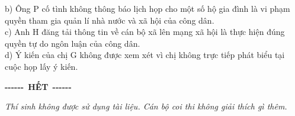 \documentclass[12pt,a4paper]{article}
\begin{document}
\noindent b) Ông P cố tình không thông báo lịch họp cho một số hộ gia đình là vi phạm quyền tham gia quản lí nhà nước và xã hội của công dân.\\


\noindent c) Anh H đăng tải thông tin về cán bộ xã lên mạng xã hội là thực hiện đúng quyền tự do ngôn luận của công dân.\\


\noindent d) Ý kiến của chị G không được xem xét vì chị không trực tiếp phát biểu tại cuộc họp lấy ý kiến.\vspace{0.6cm}
\begin{center}
{\bfseries -{}-{}-{}-{}-{}-}\ \textbf{HẾT}\ {\bfseries -{}-{}-{}-{}-{}-}
\end{center}
\vspace{0.15cm}
{\small\itshape
Thí sinh không được sử dụng tài liệu. Cán bộ coi thi không giải thích gì thêm.}
\end{document}
